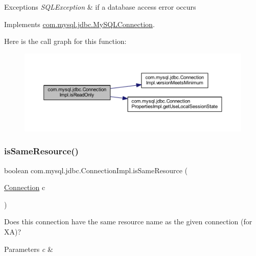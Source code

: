\begin{DoxyExceptions}{Exceptions}
{\em S\+Q\+L\+Exception} & if a database access error occurs \\
\hline
\end{DoxyExceptions}


Implements \mbox{\hyperlink{interfacecom_1_1mysql_1_1jdbc_1_1_my_s_q_l_connection}{com.\+mysql.\+jdbc.\+My\+S\+Q\+L\+Connection}}.

Here is the call graph for this function\+:\nopagebreak
\begin{figure}[H]
\begin{center}
\leavevmode
\includegraphics[width=350pt]{classcom_1_1mysql_1_1jdbc_1_1_connection_impl_a3f699d7389893a020730690607aae67c_cgraph}
\end{center}
\end{figure}
\mbox{\label{classcom_1_1mysql_1_1jdbc_1_1_connection_impl_a18299d4f2cf6b1092dfb30b5fbd33a5c}} 
\subsubsection{\texorpdfstring{is\+Same\+Resource()}{isSameResource()}}
{\footnotesize\ttfamily boolean com.\+mysql.\+jdbc.\+Connection\+Impl.\+is\+Same\+Resource (\begin{DoxyParamCaption}\item[{\mbox{\hyperlink{interfacecom_1_1mysql_1_1jdbc_1_1_connection}{Connection}}}]{c }\end{DoxyParamCaption})}

Does this connection have the same resource name as the given connection (for XA)?


\begin{DoxyParams}{Parameters}
{\em c} & \\
\hline
\end{DoxyParams}


